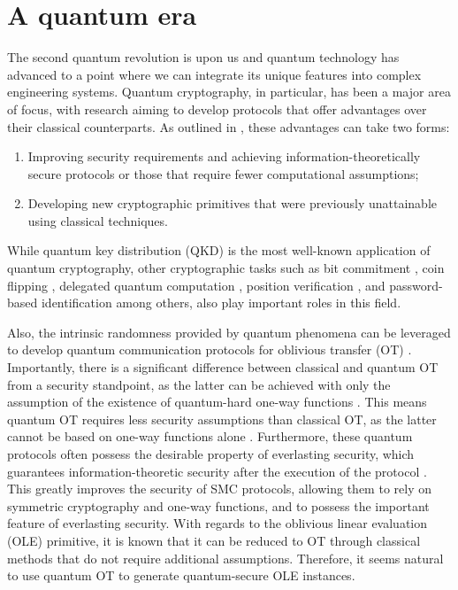 \section*{A quantum era}

The second quantum revolution is upon us and quantum technology has advanced to a point where we can integrate its unique features into complex engineering systems. Quantum cryptography, in particular, has been a major area of focus, with research aiming to develop protocols that offer advantages over their classical counterparts. As outlined in \cite{B15, PSAN13}, these advantages can take two forms:

\begin{enumerate}
\item Improving security requirements and achieving information-theoretically secure protocols or those that require fewer computational assumptions;
\item Developing new cryptographic primitives that were previously unattainable using classical techniques.
\end{enumerate}
While quantum key distribution (QKD) is the most well-known application of quantum cryptography, other cryptographic tasks such as bit commitment \cite{CK11}, coin flipping \cite{CK09}, delegated quantum computation \cite{BFK09}, position verification \cite{Unr14}, and password-based identification \cite{DFSS14, DFLSS09} among others, also play important roles in this field.

Also, the intrinsic randomness provided by quantum phenomena can be leveraged to develop quantum communication protocols for oblivious transfer (OT) \cite{BBCS92}. Importantly, there is a significant difference between classical and quantum OT from a security standpoint, as the latter can be achieved with only the assumption of the existence of quantum-hard one-way functions \cite{GLSV21, BCKM21}. This means quantum OT requires less security assumptions than classical OT, as the latter cannot be based on one-way functions alone \cite{IR89, GKMRV00}. Furthermore, these quantum protocols often possess the desirable property of everlasting security, which guarantees information-theoretic security after the execution of the protocol \citep{U10}. This greatly improves the security of SMC protocols, allowing them to rely on symmetric cryptography and one-way functions, and to possess the important feature of everlasting security. With regards to the oblivious linear evaluation (OLE) primitive, it is known that it can be reduced to OT \cite{KOS16} through classical methods that do not require additional assumptions. Therefore, it seems natural to use quantum OT to generate quantum-secure OLE instances.


